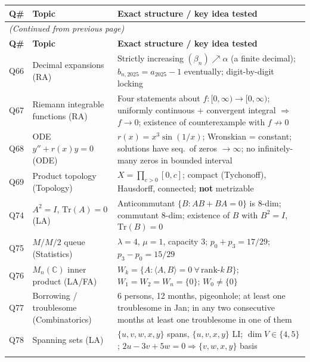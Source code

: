 \documentclass[12pt,a4paper]{article}
\begin{document}
\vspace{8pt}

\renewcommand{\arraystretch}{1.35}
\begin{longtable}{@{}p{0.6cm}p{5.5cm}p{8cm}@{}}
\toprule
\rowcolor{bluelight}
\textbf{Q\#} & \textbf{Topic} & \textbf{Exact structure / key idea tested} \\
\midrule
\endfirsthead
\multicolumn{3}{l}{\small\textit{(Continued from previous page)}}\\
\toprule
\rowcolor{bluelight}
\textbf{Q\#} & \textbf{Topic} & \textbf{Exact structure / key idea tested} \\
\midrule
\endhead
\bottomrule
\endlastfoot

Q66 & Decimal expansions (RA) & Strictly increasing $(\beta_n)\nearrow\alpha$ (a finite decimal); $b_{n,2025}=a_{2025}-1$ eventually; digit-by-digit locking \\
\addlinespace
Q67 & Riemann integrable functions (RA) & Four statements about $f:[0,\infty)\to[0,\infty)$; uniformly continuous + convergent integral $\Rightarrow$ $f\to 0$; existence of counterexample with $f\not\to 0$ \\
\addlinespace
Q68 & ODE $y''+r(x)y=0$ (ODE) & $r(x)=x^3\sin(1/x)$; Wronskian = constant; solutions have seq.\ of zeros $\to\infty$; no infinitely-many zeros in bounded interval \\
\addlinespace
Q69 & Product topology (Topology) & $X=\prod_{c>0}[0,c]$; compact (Tychonoff), Hausdorff, connected; \textbf{not} metrizable \\
\addlinespace
Q74 & $A^2=I$, $\mathrm{Tr}(A)=0$ (LA) & Anticommutant $\{B:AB+BA=0\}$ is 8-dim; commutant 8-dim; existence of $B$ with $B^2=I$, $\mathrm{Tr}(B)=0$ \\
\addlinespace
Q75 & $M/M/2$ queue (Statistics) & $\lambda=4$, $\mu=1$, capacity 3; $p_0+p_3=17/29$; $p_3-p_0=15/29$ \\
\addlinespace
Q76 & $M_n(\mathbb{C})$ inner product (LA/FA) & $W_k=\{A:\langle A,B\rangle=0\ \forall\,\mathrm{rank}\text{-}k\, B\}$; $W_1=W_2=W_n=\{0\}$; $W_0\ne\{0\}$ \\
\addlinespace
Q77 & Borrowing / troublesome (Combinatorics) & 6 persons, 12 months, pigeonhole; at least one troublesome in Jan; in any two consecutive months at least one troublesome in one of them \\
\addlinespace
Q78 & Spanning sets (LA) & $\{u,v,w,x,y\}$ spans, $\{u,v,x,y\}$ LI; $\dim V\in\{4,5\}$; $2u-3v+5w=0\Rightarrow\{v,w,x,y\}$ basis \\
\addlinespace

\end{longtable}
\end{document}
